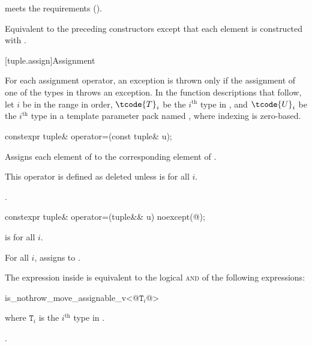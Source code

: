 \begin{itemdescr}
\pnum
\expects
{} meets the
 requirements ().

\pnum
\effects
Equivalent to the preceding constructors except that each element is constructed with
.
\end{itemdescr}

[tuple.assign]{Assignment}

\pnum
For each  assignment operator, an exception is thrown only if the
assignment of one of the types in  throws an exception.
In the function descriptions that follow, let $i$ be in the range 
in order, $\tcode{T}_i$ be the $i^\text{th}$ type in ,
and $\tcode{U}_i$ be the $i^\text{th}$ type in a
template parameter pack named , where indexing is zero-based.

%
\begin{itemdecl}
constexpr tuple& operator=(const tuple& u);
\end{itemdecl}

\begin{itemdescr}
\pnum
\effects
Assigns each element of  to the corresponding
element of .

\pnum
\remarks
This operator is defined as deleted unless
 is  for all $i$.

\pnum
\returns
{}.
\end{itemdescr}

%
\begin{itemdecl}
constexpr tuple& operator=(tuple&& u) noexcept(@\seebelow@);
\end{itemdecl}

\begin{itemdescr}
\pnum
\constraints
{} is  for all $i$.

\pnum
\effects
For all $i$, assigns  to
.

\pnum
\remarks
The expression inside  is equivalent to the logical \textsc{and} of the
following expressions:

\begin{codeblock}
is_nothrow_move_assignable_v<@$\mathtt{T}_i$@>
\end{codeblock}
where $\mathtt{T}_i$ is the $i^\text{th}$ type in .

\pnum
\returns
{}.
\end{itemdescr}

